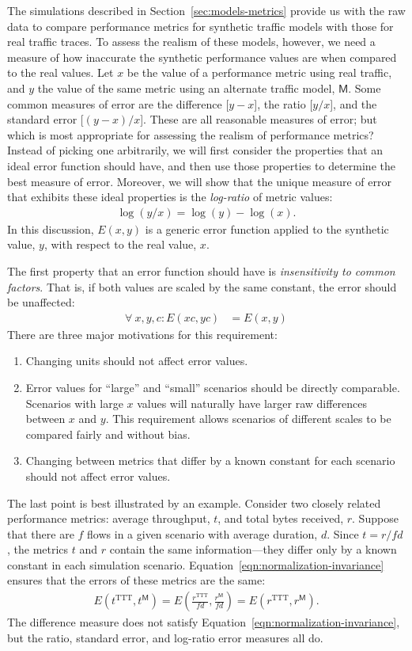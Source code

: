 \documentclass[conference]{IEEEtran}
\newcommand{\M}{\mathsf{M}}
\newcommand{\TTT}{\text{TTT}}
\begin{document}
The simulations described in Section~\ref{sec:models-metrics} provide us with the raw data to compare performance metrics for synthetic traffic models with those for real traffic traces. To assess the realism of these models, however, we need a measure of how inaccurate the synthetic performance values are when compared to the real values. Let $x$ be the value of a performance metric using real traffic, and $y$ the value of the same metric using an alternate traffic model, $\M$. Some common measures of error are the difference [$y-x$], the ratio [$y/x$], and the standard error [$(y-x)/x$]. These are all reasonable measures of error; but which is most appropriate for assessing the realism of performance metrics? Instead of picking one arbitrarily, we will first consider the properties that an ideal error function should have, and then use those properties to determine the best measure of error. Moreover, we will show that the unique measure of error that exhibits these ideal properties is the  \textit{log-ratio} of metric values:
\begin{align}
\log(y/x)=\log(y)-\log(x).
\end{align}
In this discussion, $E(x,y)$ is a generic error function applied to the synthetic value, $y$, with respect to the real value, $x$.

The first property that an error function should have is  \textit{insensitivity to common factors}. That is, if both values are scaled by the same constant, the error should be unaffected:
\begin{align}
\label{eqn:normalization-invariance}
\forall\: x,y,c: E(x c,y c) &= E(x,y)
\end{align}
There are three major motivations for this requirement:
\begin{enumerate}
\item Changing units should not affect error values.
\item Error values for ``large'' and ``small'' scenarios should be directly comparable. Scenarios with large $x$ values will naturally have larger raw differences between $x$ and $y$. This requirement allows scenarios of different scales to be compared fairly and without bias.
\item Changing between metrics that differ by a known constant for each scenario should not affect error values.
\end{enumerate}
The last point is best illustrated by an example. Consider two closely related performance metrics: average throughput, $t$, and total bytes received, $r$. Suppose that there are $f$ flows in a given scenario with average duration, $d$. Since $t =r/fd$, the metrics $t$ and $r$ contain the same information---they differ only by a known constant in each simulation scenario. Equation~\ref{eqn:normalization-invariance} ensures that the errors of these metrics are the same:
\begin{align}
E(t^\TTT,t^\M)
	= E\left({\frac{r^\TTT}{fd},\frac{r^\M}{fd}}\right)
	= E(r^\TTT,r^\M).
\end{align}
The difference measure does not satisfy Equation~\ref{eqn:normalization-invariance}, but the ratio, standard error, and log-ratio error measures all do.
\end{document}
